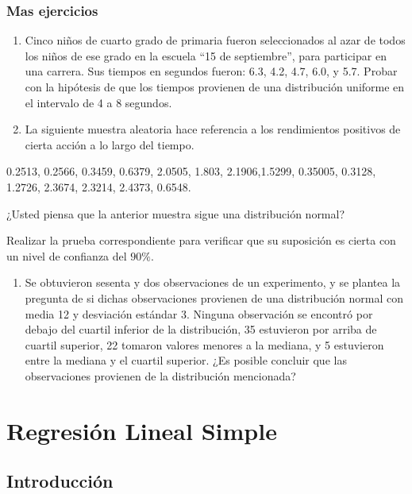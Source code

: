 \documentclass[
  a4paper,
  oneside,
  openany]{book}
\providecommand{\tightlist}{%
  \setlength{\itemsep}{0pt}\setlength{\parskip}{0pt}}
\begin{document}
\hypertarget{mas-ejercicios}{%
\section{Mas ejercicios}\label{mas-ejercicios}}

\begin{enumerate}
\def\labelenumi{\arabic{enumi}.}
\item
  Cinco niños de cuarto grado de primaria fueron seleccionados al azar de todos los niños de ese grado en la escuela ``15 de septiembre'', para participar en una carrera. Sus tiempos en segundos fueron: 6.3, 4.2, 4.7, 6.0, y 5.7. Probar con la hipótesis de que los tiempos provienen de una distribución uniforme en el intervalo de 4 a 8 segundos.
\item
  La siguiente muestra aleatoria hace referencia a los rendimientos positivos de cierta acción a lo largo del tiempo.
\end{enumerate}

0.2513, 0.2566, 0.3459, 0.6379, 2.0505, 1.803, 2.1906,1.5299,
0.35005, 0.3128, 1.2726, 2.3674, 2.3214, 2.4373, 0.6548.

¿Usted piensa que la anterior muestra sigue una distribución normal?

Realizar la prueba correspondiente para verificar que su suposición es cierta con un nivel de confianza del \(90\%\).

\begin{enumerate}
\def\labelenumi{\arabic{enumi}.}
\setcounter{enumi}{2}
\tightlist
\item
  Se obtuvieron sesenta y dos observaciones de un experimento, y se plantea la pregunta de si dichas observaciones provienen de una distribución normal con media 12 y desviación estándar 3. Ninguna observación se encontró por debajo del cuartil inferior de la distribución, 35 estuvieron por arriba de cuartil superior, 22 tomaron valores menores a la mediana, y 5 estuvieron entre la mediana y el cuartil superior. ¿Es posible concluir que las observaciones provienen de la distribución mencionada?
\end{enumerate}

\hypertarget{part-regresiuxf3n-lineal-simple}{%
\part{Regresión Lineal Simple}\label{part-regresiuxf3n-lineal-simple}}

\hypertarget{introducciuxf3n-5}{%
\chapter*{Introducción}\label{introducciuxf3n-5}}
\end{document}
